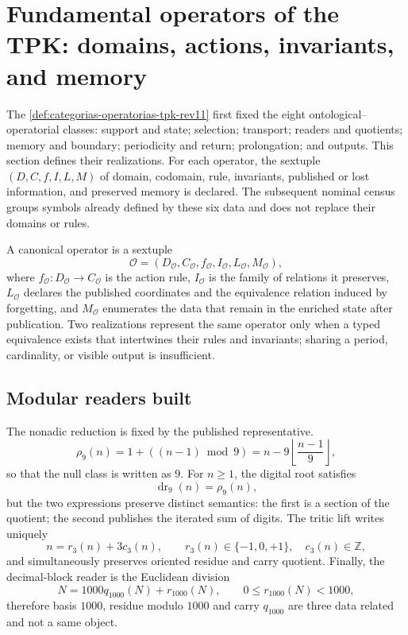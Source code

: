 \section{Fundamental operators of the TPK: domains, actions, invariants, and memory}
\label{sec:inventario-operatorio-tpk-rev11}

The \cref{def:categorias-operatorias-tpk-rev11} first fixed the eight
ontological--operatorial classes: support and state; selection; transport;
readers and quotients; memory and boundary; periodicity and return;
prolongation; and outputs. This section defines their realizations. For each
operator, the sextuple \((D,C,f,I,L,M)\) of domain, codomain, rule,
invariants, published or lost information, and preserved memory is declared. The subsequent
nominal census groups symbols already defined by these six data and does not
replace their domains or rules.

\begin{definition}
A canonical operator is a sextuple
\[
 \mathcal O=(D_{\mathcal O},C_{\mathcal O},f_{\mathcal O},
 I_{\mathcal O},L_{\mathcal O},M_{\mathcal O}),
\]
where \(f_{\mathcal O}:D_{\mathcal O}\to C_{\mathcal O}\) is the action rule, \(I_{\mathcal O}\) is the family of relations it preserves, \(L_{\mathcal O}\) declares the published coordinates and the equivalence relation induced by forgetting, and \(M_{\mathcal O}\) enumerates the data that remain in the enriched state after publication. Two realizations represent the same operator only when a typed equivalence exists that intertwines their rules and invariants; sharing a period, cardinality, or visible output is insufficient.
\end{definition}

\subsection{Modular readers built}

The nonadic reduction is fixed by the published representative.
\begin{equation}
 \rho_9(n)=1+((n-1)\bmod 9)
 =n-9\left\lfloor\frac{n-1}{9}\right\rfloor,
 \label{eq:rho9-construida-tpk-rev11}
\end{equation}
so that the null class is written as \(9\). For \(n\geq1\), the
digital root satisfies
\[
 \operatorname{dr}_9(n)=\rho_9(n),
\]
but the two expressions preserve distinct semantics: the first is a
section of the quotient; the second publishes the iterated sum of digits. The tritic
lift writes uniquely
\begin{equation}
 n=r_3(n)+3c_3(n),
 \qquad r_3(n)\in\{-1,0,+1\},\quad c_3(n)\in\mathbb Z,
 \label{eq:lift-mod3-tpk-rev11}
\end{equation}
and simultaneously preserves oriented residue and carry quotient.
Finally, the decimal-block reader is the Euclidean division
\begin{equation}
 N=1000q_{1000}(N)+r_{1000}(N),
 \qquad 0\leq r_{1000}(N)<1000,
 \label{eq:lector-mod1000-tpk-rev11}
\end{equation}
therefore basis \(1000\), residue modulo \(1000\) and carry \(q_{1000}\)
are three data related and not a same object.

